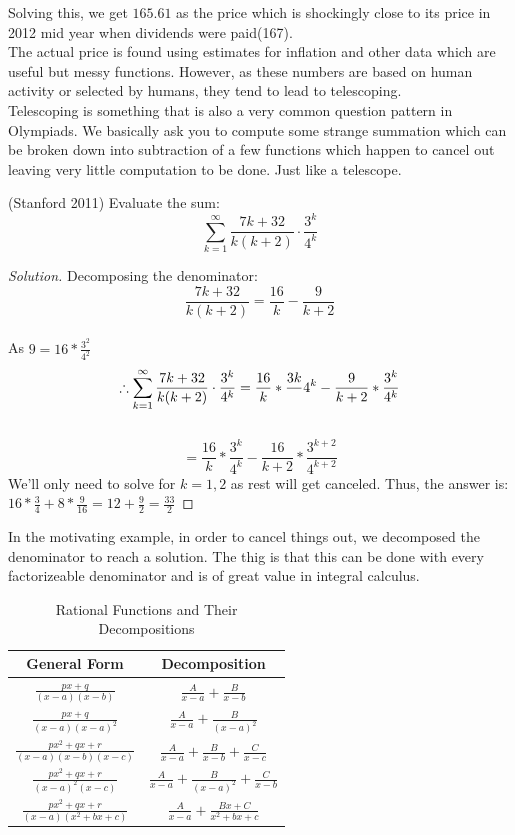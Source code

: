 Solving this, we get $165.61$ as the price which is shockingly close to its price in 2012 mid year when dividends were paid(167).\\
The actual price is found using estimates for inflation and other data which are useful but messy functions. However, as these numbers are based on human activity or selected by humans, they tend to lead to telescoping.\\
Telescoping is something that is also a very common question pattern in Olympiads. We basically ask you to compute some strange summation which can be broken down into subtraction of a few functions which happen to cancel out leaving very little computation to be done. Just like a telescope.\\
\begin{example}
    (Stanford 2011) Evaluate the sum:\\
    \[\sum^{\infty}_{k=1}\frac{7k+32}{k(k+2)}\cdot\frac{3^k}{4^k}\]
\end{example}
\begin{proof}
    [Solution]
    Decomposing the denominator:
    \[\frac{7k+32}{k(k+2)}=\frac{16}{k}-\frac{9}{k+2}\]\\
    As $9=16*\frac{3^2}{4^2}$\\
    \[\therefore \sum^{\infty}_{k=1}\frac{7k+32}{k(k+2)}\cdot\frac{3^k}{4^k} = \frac{16}{k}*\frac{3k}\\
    {4^k}-\frac{9}{k+2}*\frac{3^k}{4^k}\]\\
    \[=\frac{16}{k}*\frac{3^k}{4^k}-\frac{16}{k+2}*\frac{3^{k+2}}{4^{k+2}}\]
    We'll only need to solve for $k=1,2$ as rest will get canceled. Thus, the answer is: $16*\frac{3}{4}+8*\frac{9}{16}=12+\frac{9}{2}=\frac{33}{2}$
\end{proof}
In the motivating example, in order to cancel things out, we decomposed the denominator to reach a solution. The thig is that this can be done with every factorizeable denominator and is of great value in integral calculus.\\
\begin{table}[htbp]
  \centering
  \caption{Rational Functions and Their Decompositions}
  \label{tab:rational-functions}
  \begin{tabular}{|c|c|}
    \hline
    \textbf{General Form} & \textbf{Decomposition} \\
    \hline
    $\frac{px+q}{(x-a)(x-b)}$ & $\frac{A}{x-a}+\frac{B}{x-b}$ \\
    \hline    
    $\frac{px+q}{(x-a)(x-a)^2}$ & $\frac{A}{x-a}+\frac{B}{(x-a)^2}$ \\
    \hline
    $\frac{px^2+qx+r}{(x-a)(x-b)(x-c)}$ & $\frac{A}{x-a}+\frac{B}{x-b}+\frac{C}{x-c}$\\
    \hline
   $\frac{px^2+qx+r}{(x-a)^2(x-c)}$ & $\frac{A}{x-a}+\frac{B}{(x-a)^2}+\frac{C}{x-b}$\\
    \hline
    $\frac{px^2+qx+r}{(x-a)(x^2+bx+c)}$ & $\frac{A}{x-a}+\frac{Bx+C}{x^2+bx+c}$\\
  \end{tabular}
\end{table}
